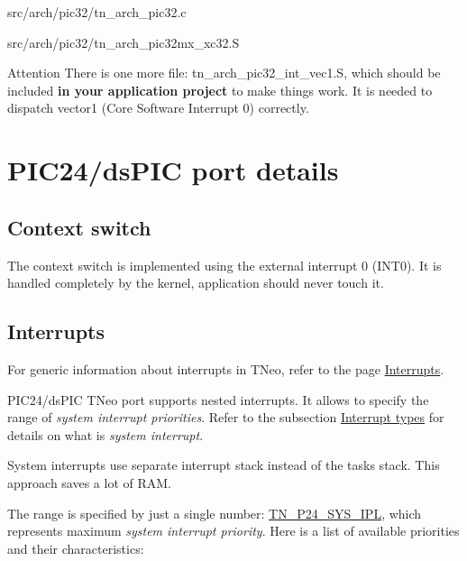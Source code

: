 \begin{DoxyItemize}
\item {\ttfamily src/arch/pic32/tn\+\_\+arch\+\_\+pic32.\+c}
\item {\ttfamily src/arch/pic32/tn\+\_\+arch\+\_\+pic32mx\+\_\+xc32.\+S}
\end{DoxyItemize}

\begin{DoxyAttention}{Attention}
There is one more file\+: {\ttfamily tn\+\_\+arch\+\_\+pic32\+\_\+int\+\_\+vec1.\+S}, which should be included {\bfseries in your application project} to make things work. It is needed to dispatch vector1 (Core Software Interrupt 0) correctly.
\end{DoxyAttention}
\hypertarget{arch_specific_pic24_details}{}\section{P\+I\+C24/ds\+P\+I\+C port details}\label{arch_specific_pic24_details}
\hypertarget{arch_specific_pic24_context_switch}{}\subsection{Context switch}\label{arch_specific_pic24_context_switch}
The context switch is implemented using the external interrupt 0 ({\ttfamily I\+N\+T0}). It is handled completely by the kernel, application should never touch it.\hypertarget{arch_specific_pic24_interrupts}{}\subsection{Interrupts}\label{arch_specific_pic24_interrupts}
For generic information about interrupts in T\+Neo, refer to the page \hyperlink{interrupts}{Interrupts}.

P\+I\+C24/ds\+P\+IC T\+Neo port supports nested interrupts. It allows to specify the range of {\itshape system interrupt priorities}. Refer to the subsection \hyperlink{interrupts_interrupt_types}{Interrupt types} for details on what is {\itshape system interrupt}.

System interrupts use separate interrupt stack instead of the task\textquotesingle{}s stack. This approach saves a lot of R\+AM.

The range is specified by just a single number\+: {\ttfamily \hyperlink{tn__cfg__default_8h_a4feb7eb34fc2f175167b7496b63c398a}{T\+N\+\_\+\+P24\+\_\+\+S\+Y\+S\+\_\+\+I\+PL}}, which represents maximum {\itshape system interrupt priority}. Here is a list of available priorities and their characteristics\+:


